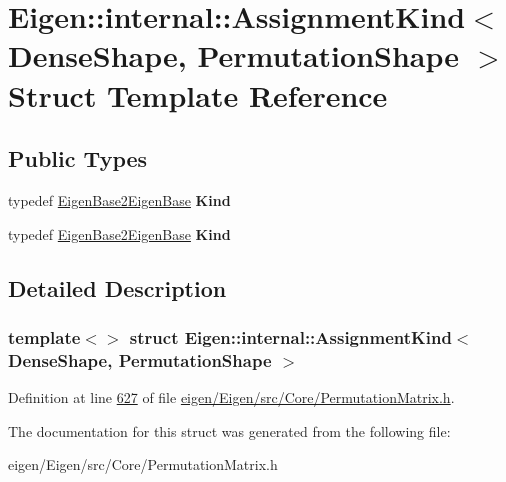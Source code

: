 \hypertarget{struct_eigen_1_1internal_1_1_assignment_kind_3_01_dense_shape_00_01_permutation_shape_01_4}{}\section{Eigen\+:\+:internal\+:\+:Assignment\+Kind$<$ Dense\+Shape, Permutation\+Shape $>$ Struct Template Reference}
\label{struct_eigen_1_1internal_1_1_assignment_kind_3_01_dense_shape_00_01_permutation_shape_01_4}
\subsection*{Public Types}
\begin{DoxyCompactItemize}
\item 
\mbox{\label{struct_eigen_1_1internal_1_1_assignment_kind_3_01_dense_shape_00_01_permutation_shape_01_4_a9c2e38eade45a93b83c5af22f5a2e7f5}} 
typedef \hyperlink{struct_eigen_1_1internal_1_1_eigen_base2_eigen_base}{Eigen\+Base2\+Eigen\+Base} {\bfseries Kind}
\item 
\mbox{\label{struct_eigen_1_1internal_1_1_assignment_kind_3_01_dense_shape_00_01_permutation_shape_01_4_a9c2e38eade45a93b83c5af22f5a2e7f5}} 
typedef \hyperlink{struct_eigen_1_1internal_1_1_eigen_base2_eigen_base}{Eigen\+Base2\+Eigen\+Base} {\bfseries Kind}
\end{DoxyCompactItemize}


\subsection{Detailed Description}
\subsubsection*{template$<$$>$\newline
struct Eigen\+::internal\+::\+Assignment\+Kind$<$ Dense\+Shape, Permutation\+Shape $>$}



Definition at line \hyperlink{eigen_2_eigen_2src_2_core_2_permutation_matrix_8h_source_l00627}{627} of file \hyperlink{eigen_2_eigen_2src_2_core_2_permutation_matrix_8h_source}{eigen/\+Eigen/src/\+Core/\+Permutation\+Matrix.\+h}.



The documentation for this struct was generated from the following file\+:\begin{DoxyCompactItemize}
\item 
eigen/\+Eigen/src/\+Core/\+Permutation\+Matrix.\+h\end{DoxyCompactItemize}
